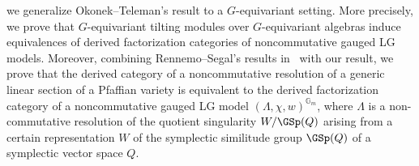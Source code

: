 we generalize Okonek--Teleman's result to a $G$-equivariant setting. More precisely, we prove that $G$-equivariant tilting modules over $G$-equivariant algebras induce equivalences of derived factorization categories of noncommutative gauged LG models. Moreover, combining Rennemo--Segal's results in~\cite{rs} with our result, we prove that the derived category of a noncommutative resolution of a generic linear section of a Pfaffian variety is equivalent to the derived factorization category of a noncommutative gauged LG model $(\Lambda, \chi, w)^{\mathbb{G}_m}$, where $\Lambda$ is a non-commutative resolution of the quotient singularity $W/\GSp(Q)$ arising from a certain representation $W$ of the symplectic similitude group $\GSp(Q)$ of a symplectic vector space $Q$.
